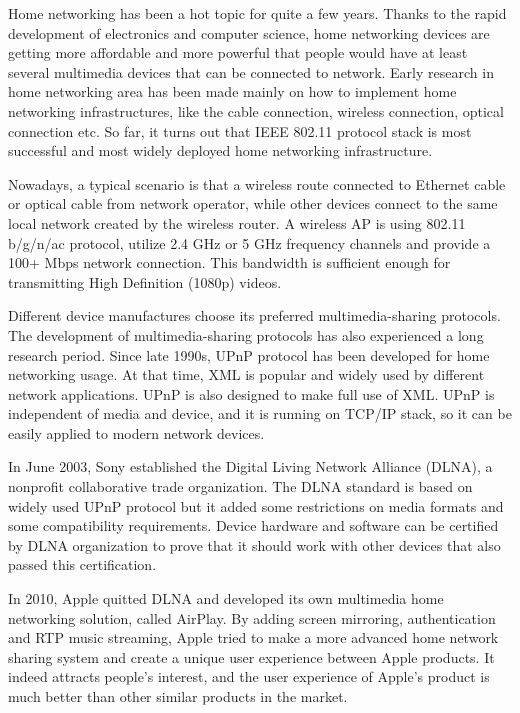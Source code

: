 Home networking has been a hot topic for quite a few years. Thanks to the rapid development of electronics and computer science, home networking devices are getting more affordable and more powerful that people would have at least several multimedia devices that can be connected to network.
Early research in home networking area has been made mainly on how to implement home networking infrastructures, like the cable connection, wireless connection, optical connection etc. So far, it turns out that IEEE 802.11 protocol stack is most successful and most widely deployed home networking infrastructure.

Nowadays, a typical scenario is that a wireless route connected to Ethernet cable or optical cable from network operator, while other devices connect to the same local network created by the wireless router. A wireless AP is using 802.11 b/g/n/ac protocol, utilize 2.4 GHz or 5 GHz frequency channels and provide a 100+ Mbps network connection. This bandwidth is sufficient enough for transmitting High Definition (1080p) videos.

Different device manufactures choose its preferred multimedia-sharing protocols. The development of multimedia-sharing protocols has also experienced a long research period. Since late 1990s, UPnP protocol has been developed for home networking usage. At that time, XML is popular and widely used by different network applications. UPnP is also designed to make full use of XML. UPnP is independent of media and device, and it is running on TCP/IP stack, so it can be easily applied to modern network devices. 

In June 2003, Sony established the Digital Living Network Alliance (DLNA), a nonprofit collaborative trade organization. The DLNA standard is based on widely used UPnP protocol but it added some restrictions on media formats and some compatibility requirements. Device hardware and software can be certified by DLNA organization to prove that it should work with other devices that also passed this certification.

In 2010, Apple quitted DLNA and developed its own multimedia home networking solution, called AirPlay. By adding screen mirroring, authentication and RTP music streaming, Apple tried to make a more advanced home network sharing system and create a unique user experience between Apple products. It indeed attracts people's interest, and the user experience of Apple's product is much better than other similar products in the market. 

